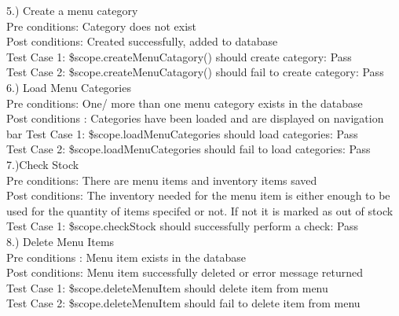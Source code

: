 \documentclass[a4paper,12pt]{article}
\begin{document}
5.) Create a menu category \\ 
Pre conditions: Category does not exist \\
Post conditions: Created successfully, added to database\\
Test Case 1: \$scope.createMenuCatagory() should create category: Pass \\
Test Case 2: \$scope.createMenuCatagory() should fail to create category: Pass \\

6.) Load Menu Categories \\
Pre conditions: One/ more than one menu category exists in the database \\
Post conditions : Categories have been loaded and are displayed on navigation bar 
Test Case 1: \$scope.loadMenuCategories should load categories: Pass \\
Test Case 2: \$scope.loadMenuCategories should fail to load categories: Pass \\

7.)Check Stock \\
Pre conditions: There are menu items and inventory items saved\\
Post conditions: The inventory needed for the menu item is either enough to be used for the quantity of items specifed or not. If not it is marked as out of stock\\
Test Case 1: \$scope.checkStock should successfully perform a check: Pass \\  

8.) Delete Menu Items \\
Pre conditions : Menu item exists in the database \\
Post conditions: Menu item successfully deleted or error message returned \\
Test Case 1: \$scope.deleteMenuItem should delete item from menu \\
Test Case 2: \$scope.deleteMenuItem should fail to delete item from menu \\
\end{document}
